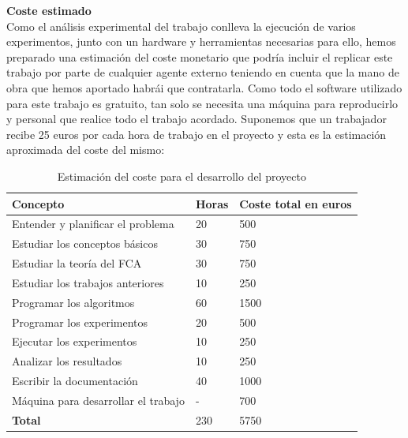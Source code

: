 \documentclass[oneside,openright,titlepage,numbers=noenddot,openany,headinclude,footinclude=true,
cleardoublepage=empty,abstractoff,BCOR=5mm,paper=a4,fontsize=12pt,main=spanish]{scrreprt}
\begin{document}
\textbf{Coste estimado}\\

Como el análisis experimental del trabajo conlleva la ejecución de varios experimentos, junto con un hardware y herramientas necesarias para ello, hemos preparado una estimación del coste monetario que podría incluir el replicar este trabajo por parte de cualquier agente externo teniendo en cuenta que la mano de obra que hemos aportado habrái que contratarla. Como todo el software utilizado para este trabajo es gratuito, tan solo se necesita una máquina para reproducirlo y personal que realice todo el trabajo acordado. Suponemos que un trabajador recibe 25 euros por cada hora de trabajo en el proyecto y esta es la estimación aproximada del coste del mismo:

\begin{table}[H]
\centering
\begin{tabular}{lll}
\hline
\textbf{Concepto}                   & \textbf{Horas} & \textbf{Coste total en euros} \\ \hline
Entender y planificar el problema   & 20             & 500                           \\
Estudiar los conceptos básicos      & 30             & 750                           \\
Estudiar la teoría del FCA          & 30             & 750                           \\
Estudiar los trabajos anteriores    & 10             & 250                           \\ \hline
Programar los algoritmos            & 60             & 1500                          \\
Programar los experimentos          & 20             & 500                           \\
Ejecutar los experimentos           & 10             & 250                           \\ \hline
Analizar los resultados             & 10             & 250                           \\
Escribir la documentación           & 40             & 1000                          \\ \hline
Máquina para desarrollar el trabajo & -              & 700                           \\ \hline
\textbf{Total}                      & 230            & 5750                          \\ \hline
\end{tabular}
\caption{Estimación del coste para el desarrollo del proyecto}
\label{tab:coste}
\end{table}
\end{document}
